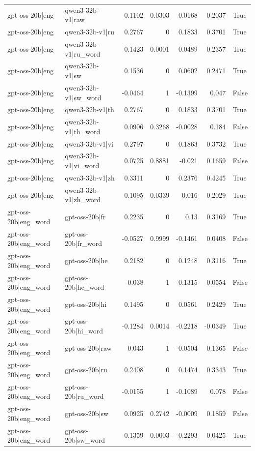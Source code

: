 \begin{table}
\begin{tabular}{l l r r r r l}
gpt-oss-20b|eng & qwen3-32b-v1|raw & 0.1102 & 0.0303 & 0.0168 & 0.2037 & True \\
gpt-oss-20b|eng & qwen3-32b-v1|ru & 0.2767 & 0 & 0.1833 & 0.3701 & True \\
gpt-oss-20b|eng & qwen3-32b-v1|ru_word & 0.1423 & 0.0001 & 0.0489 & 0.2357 & True \\
gpt-oss-20b|eng & qwen3-32b-v1|sw & 0.1536 & 0 & 0.0602 & 0.2471 & True \\
gpt-oss-20b|eng & qwen3-32b-v1|sw_word & -0.0464 & 1 & -0.1399 & 0.047 & False \\
gpt-oss-20b|eng & qwen3-32b-v1|th & 0.2767 & 0 & 0.1833 & 0.3701 & True \\
gpt-oss-20b|eng & qwen3-32b-v1|th_word & 0.0906 & 0.3268 & -0.0028 & 0.184 & False \\
gpt-oss-20b|eng & qwen3-32b-v1|vi & 0.2797 & 0 & 0.1863 & 0.3732 & True \\
gpt-oss-20b|eng & qwen3-32b-v1|vi_word & 0.0725 & 0.8881 & -0.021 & 0.1659 & False \\
gpt-oss-20b|eng & qwen3-32b-v1|zh & 0.3311 & 0 & 0.2376 & 0.4245 & True \\
gpt-oss-20b|eng & qwen3-32b-v1|zh_word & 0.1095 & 0.0339 & 0.016 & 0.2029 & True \\
gpt-oss-20b|eng_word & gpt-oss-20b|fr & 0.2235 & 0 & 0.13 & 0.3169 & True \\
gpt-oss-20b|eng_word & gpt-oss-20b|fr_word & -0.0527 & 0.9999 & -0.1461 & 0.0408 & False \\
gpt-oss-20b|eng_word & gpt-oss-20b|he & 0.2182 & 0 & 0.1248 & 0.3116 & True \\
gpt-oss-20b|eng_word & gpt-oss-20b|he_word & -0.038 & 1 & -0.1315 & 0.0554 & False \\
gpt-oss-20b|eng_word & gpt-oss-20b|hi & 0.1495 & 0 & 0.0561 & 0.2429 & True \\
gpt-oss-20b|eng_word & gpt-oss-20b|hi_word & -0.1284 & 0.0014 & -0.2218 & -0.0349 & True \\
gpt-oss-20b|eng_word & gpt-oss-20b|raw & 0.043 & 1 & -0.0504 & 0.1365 & False \\
gpt-oss-20b|eng_word & gpt-oss-20b|ru & 0.2408 & 0 & 0.1474 & 0.3343 & True \\
gpt-oss-20b|eng_word & gpt-oss-20b|ru_word & -0.0155 & 1 & -0.1089 & 0.078 & False \\
gpt-oss-20b|eng_word & gpt-oss-20b|sw & 0.0925 & 0.2742 & -0.0009 & 0.1859 & False \\
gpt-oss-20b|eng_word & gpt-oss-20b|sw_word & -0.1359 & 0.0003 & -0.2293 & -0.0425 & True \\

\end{tabular}
\end{table}
